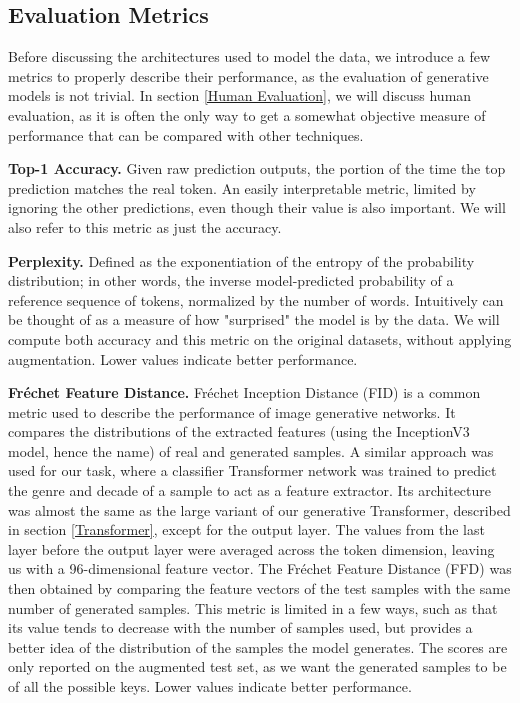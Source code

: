 \documentclass{article}
\begin{document}
\subsection{Evaluation Metrics}

Before discussing the architectures used to model the data, we introduce a few metrics to properly describe their performance, as the evaluation of generative models is not trivial. In section \ref{Human Evaluation}, we will discuss human evaluation, as it is often the only way to get a somewhat objective measure of performance that can be compared with other techniques.

\textbf{Top-1 Accuracy.} Given raw prediction outputs, the portion of the time the top prediction matches the real token. An easily interpretable metric, limited by ignoring the other predictions, even though their value is also important. We will also refer to this metric as just the accuracy.

\textbf{Perplexity.} Defined as the exponentiation of the entropy of the probability distribution; in other words, the inverse model-predicted probability of a reference sequence of tokens, normalized by the number of words. Intuitively can be thought of as a measure of how "surprised" the model is by the data. We will compute both accuracy and this metric on the original datasets, without applying augmentation. Lower values indicate better performance.

\textbf{Fr\'echet Feature Distance.} Fr\'echet Inception Distance (FID) is a common metric used to describe the performance of image generative networks. It compares the distributions of the extracted features (using the InceptionV3 model, hence the name) of real and generated samples. A similar approach was used for our task, where a classifier Transformer network was trained to predict the genre and decade of a sample to act as a feature extractor. Its architecture was almost the same as the large variant of our generative Transformer, described in section \ref{Transformer}, except for the output layer. The values from the last layer before the output layer were averaged across the token dimension, leaving us with a 96-dimensional feature vector. The Fr\'echet Feature Distance (FFD) was then obtained by comparing the feature vectors of the test samples with the same number of generated samples. This metric is limited in a few ways, such as that its value tends to decrease with the number of samples used, but provides a better idea of the distribution of the samples the model generates. The scores are only reported on the augmented test set, as we want the generated samples to be of all the possible keys. Lower values indicate better performance.
\end{document}
